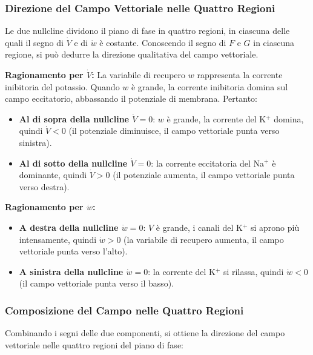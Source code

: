 \subsubsection{Direzione del Campo Vettoriale nelle Quattro Regioni}

Le due nullcline dividono il piano di fase in quattro regioni, in ciascuna delle quali il segno di $\dot{V}$ e di $\dot{w}$ è costante. Conoscendo il segno di $F$ e $G$ in ciascuna regione, si può dedurre la direzione qualitativa del campo vettoriale.

\textbf{Ragionamento per $\dot{V}$:}
La variabile di recupero $w$ rappresenta la corrente inibitoria del potassio. Quando $w$ è grande, la corrente inibitoria domina sul campo eccitatorio, abbassando il potenziale di membrana. Pertanto:
\begin{itemize}
    \item \textbf{Al di sopra della nullcline $\dot{V} = 0$}: $w$ è grande, la corrente del K$^+$ domina, quindi $\dot{V} < 0$ (il potenziale diminuisce, il campo vettoriale punta verso sinistra).
    \item \textbf{Al di sotto della nullcline $\dot{V} = 0$}: la corrente eccitatoria del Na$^+$ è dominante, quindi $\dot{V} > 0$ (il potenziale aumenta, il campo vettoriale punta verso destra).
\end{itemize}

\textbf{Ragionamento per $\dot{w}$:}
\begin{itemize}
    \item \textbf{A destra della nullcline $\dot{w} = 0$}: $V$ è grande, i canali del K$^+$ si aprono più intensamente, quindi $\dot{w} > 0$ (la variabile di recupero aumenta, il campo vettoriale punta verso l'alto).
    \item \textbf{A sinistra della nullcline $\dot{w} = 0$}: la corrente del K$^+$ si rilassa, quindi $\dot{w} < 0$ (il campo vettoriale punta verso il basso).
\end{itemize}

\subsubsection{Composizione del Campo nelle Quattro Regioni}

Combinando i segni delle due componenti, si ottiene la direzione del campo vettoriale nelle quattro regioni del piano di fase:

